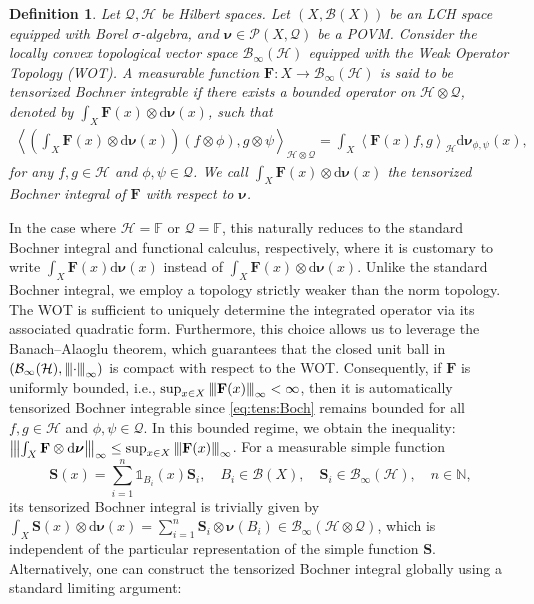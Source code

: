 \documentclass[noinfoline]{imsart}\setcounter{tocdepth}{2}
\renewcommand{\b}[1]{\mathbb{#1}} %
\newcommand{\m}[1]{\mathbf{#1}} %
\newcommand{\s}[1]{\mathscr{#1}} %
\renewcommand{\c}[1]{\mathcal{#1}} %
\newcommand{\ds}[1]{\mathds{#1}} %
\newcommand{\mb}[1]{\boldsymbol{#1}} %
\newcommand{\rd}{\mathrm{d}} %
\newcommand{\vertiii}[1]{{\left\vert\kern-0.25ex\left\vert\kern-0.25ex\left\vert #1 
    \right\vert\kern-0.25ex\right\vert\kern-0.25ex\right\vert}} %
\newcommand{\innpr}[2]{{\left\langle {#1},{#2}\right\rangle}} %
\theoremstyle{plain}
\newtheorem{definition}[theorem]{Definition}
\begin{document}
\begin{appendix}
\begin{definition}
Let $\c{Q}, \c{H}$ be Hilbert spaces. Let $(X, \s{B}(X))$ be an LCH space equipped with Borel $\sigma$-algebra, and $\mb{\nu} \in \s{P}(X, \c{Q})$ be a POVM. Consider the locally convex topological vector space $\c{B}_{\infty}(\c{H})$ equipped with the Weak Operator Topology (WOT). A measurable function $\m{F}: X \to \c{B}_{\infty}(\c{H})$ is said to be \textit{tensorized Bochner integrable} if there exists a bounded 
operator on $\c{H} \otimes \c{Q}$, denoted by $\int_{X} \m{F}(x) \otimes \rd \mb{\nu}(x)$, such that
\begin{align}\label{eq:tens:Boch}
    \innpr{\left( \int_{X} \m{F}(x) \otimes \rd \mb{\nu}(x) \right) (f \otimes \phi)}{g \otimes \psi}_{\c{H} \otimes \c{Q}} = \int_{X} \innpr{\m{F}(x) f}{g}_{\c{H}} \rd \mb{\nu}_{\phi, \psi} (x),
\end{align}
for any $f, g \in \c{H}$ and $\phi, \psi \in \c{Q}$. We call $\int_{X} \m{F}(x) \otimes \rd \mb{\nu}(x)$ the tensorized Bochner integral of $\m{F}$ with respect to $\mb{\nu}$.
\end{definition}

In the case where $\c{H} = \b{F}$ or $\c{Q} = \b{F}$, this naturally reduces to the standard Bochner integral and functional calculus, respectively, where it is customary to write $\int_{X} \m{F}(x) \rd \mb{\nu}(x)$ instead of $\int_{X} \m{F}(x) \otimes \rd \mb{\nu}(x)$.
Unlike the standard Bochner integral, we employ a topology strictly weaker than the norm topology. The WOT is sufficient to uniquely determine the integrated operator via its associated quadratic form. Furthermore, this choice allows us to leverage the Banach--Alaoglu theorem, which guarantees that the closed unit ball in $(\c{B}_{\infty}(\c{H}), \vertiii{\cdot}_{\infty})$ is compact with respect to the WOT. Consequently, if $\m{F}$ is uniformly bounded, i.e., $\sup_{x \in X} \vertiii{\m{F}(x)}_{\infty} < \infty$, then it is automatically tensorized Bochner integrable since \eqref{eq:tens:Boch} remains bounded for all $f, g \in \c{H}$ and $\phi, \psi \in \c{Q}$. In this bounded regime, we obtain the inequality: $\vertiii{\int_{X} \m{F} \otimes \rd \mb{\nu}}_{\infty} \le \sup_{x \in X} \vertiii{\m{F}(x)}_{\infty}$. For a measurable simple function
\begin{equation*}
    \m{S}(x) = \sum_{i=1}^{n} \ds{1}_{B_{i}}(x) \m{S}_{i}, \quad B_{i} \in \s{B}(X), \quad \m{S}_{i} \in \c{B}_{\infty}(\c{H}), \quad n \in \b{N},
\end{equation*}
its tensorized Bochner integral is trivially given by $\int_{X} \m{S}(x) \otimes \rd \mb{\nu}(x) = \sum_{i=1}^{n} \m{S}_{i} \otimes \mb{\nu}(B_{i}) \in \c{B}_{\infty}(\c{H} \otimes \c{Q})$, which is independent of the particular representation of the simple function $\m{S}$.
Alternatively, one can construct the tensorized Bochner integral globally using a standard limiting argument:


\end{appendix}
\end{document}
